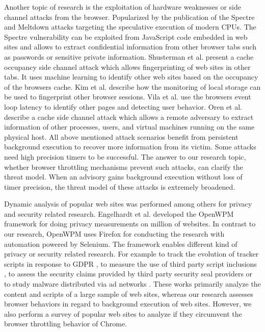 \documentclass[
	ruledheaders=section,%
	class=report,%
	thesis={type=bachelor},%
	accentcolor=9c,%
	custommargins=true,%
	marginpar=false,%
	parskip=half-,%
	fontsize=11pt,%
]{tudapub}
\begin{document}
  Another topic of research is the exploitation of hardware weaknesses or side channel attacks from the browser. Popularized by the publication of the Spectre \cite{Kocher2018spectre} and Meltdown \cite{Lipp2018meltdown} attacks targeting the speculative execution of modern CPUs. The Spectre vulnerability can be exploited from JavaScript code embedded in web sites and allows to extract confidential information from other browser tabs such as passwords or sensitive private information. Shusterman et al. \cite{shusterman2019robust} present a cache occupancy side channel attack which allows fingerprinting of web sites in other tabs. It uses machine learning to identify other web sites based on the occupancy of the browsers cache. Kim et al. \cite{kim2016inferring} describe how the monitoring of local storage can be used to fingerprint other browser sessions. Vila et al. \cite{vila2017loophole} use the browsers event loop latency to identify other pages and detecting user behavior. Oren et al. \cite{oren2015spy} describe a cache side channel attack which allows a remote adversary to extract information of other processes, users, and virtual machines running on the same physical host. All above mentioned attack scenarios benefit from persistent background execution to recover more information from its victim. Some attacks need high precision timers to be successful. The answer to our research topic, whether browser throttling mechanisms prevent such attacks, can clarify the threat model. When an advisory gains background execution without loss of timer precision, the threat model of these attacks is extremely broadened.

  Dynamic analysis of popular web sites was performed among others for privacy and security related research. Engelhardt et al. \cite{englehardt2016online} developed the OpenWPM framework for doing privacy measurements on million of websites. In contrast to our research, OpenWPM uses Firefox for conducting the research with automation powered by Selenium. The framework enables different kind of privacy or security related research. For example to track the evolution of tracker scripts in response to GDPR \cite{solomos2019clash}, to measure the use of third party script inclusions \cite{nikiforakis2012you}, to assess the security claims provided by third party security seal providers \cite{van2014clubbing} or to study malware distributed via ad networks \cite{zarras2014dark}. These works primarily analyze the content and scripts of a large sample of web sites, whereas our research assesses browser behaviors in regard to background execution of web sites. However, we also perform a survey of popular web sites to analyze if they circumvent the browser throttling behavior of Chrome.
  
\end{document}
